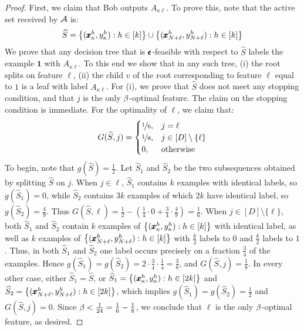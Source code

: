 \begin{proof}
First, we claim that Bob outputs $A_{\kappa\ell}$. To prove this, note that the active set received by $\mathcal{A}$ is:
\begin{align*}
    \widehat S = \left\{(\pmb{x}_{ \kappa }^h,y_{ \kappa}^h) : h \in [k] \right\} \cup \left\{(\pmb{x}_{ N+\ell }^h, y_{N +\ell}^h) : h \in [k]\right\} 
\end{align*}
We prove that any decision tree that is $\pmb{\epsilon}$-feasible with respect to $\widehat S$ labels the example $\pmb{1}$ with $A_{\kappa \ell}$. To this end we show that in any such tree, (i) the root splits on feature $\ell$, (ii) the child $v$ of the root corresponding to feature $\ell$ equal to $1$ is a leaf with label $A_{\kappa\ell}$. For (i), we prove that $\widehat S$ does not meet any stopping condition, and that $j$ is the only $\beta$-optimal feature. The claim on the stopping condition is immediate. For the optimality of $\ell$, we claim that:
\begin{align}
    G(\widehat S, j) =
\begin{cases}
\nicefrac{1}{6},& j=\ell\\
\nicefrac{1}{8},& j \in [D] \setminus \{\ell\}\\
0, &\text{otherwise}
\end{cases}
\end{align}
To begin, note that $g(\widehat S)=\frac{1}{2}$. Let $\widehat S_1$ and $\widehat S_2$ be the two subsequences obtained by splitting $\widehat S$ on $j$. When $j \in \ell$, $\widehat S_1$ contains $k$ examples with identical labels, so $g(\widehat S_1)=0$, while $\widehat S_2$ contains $3k$ examples of which $2k$ have identical label, so $g(\widehat S_2)=\frac{4}{9}$. Thus $G(\widehat S,\ell) = \frac{1}{2} - \left(\frac{1}{4}\cdot 0 + \frac{3}{4} \cdot \frac{4}{9}\right) = \frac{1}{6}$.
When $j \in [D] \setminus \{\ell\}$, both $\widehat S_1$ and $\widehat S_2$ contain $k$ examples of $\left\{(\pmb{x}_{ \kappa }^h,y_{ \kappa}^h) : h \in [k] \right\}$ with identical label, as well as $k$ examples of $\left\{(\pmb{x}_{N+\ell}^h,y_{N+\ell}^h) : h \in [k]\right\}$ with $\frac{k}{2}$ labels to $0$ and $\frac{k}{2}$ labels to $1$. Thus, in both $\widehat S_1$ and $\widehat S_2$ one label occurs precisely on a fraction $\frac{3}{4}$ of the examples. Hence $g(\widehat S_1)=g(\widehat S_2)=2 \cdot \frac{3}{4} \cdot \frac{1}{4} = \frac{3}{8}$, and $G(\widehat S,j) = \frac{1}{8}$. 
In every other case, either $\widehat S_1=\widehat S$, or $\widehat S_1=\left\{(\pmb{x}_{ \kappa }^h,y_{ \kappa}^h) : h \in [2k] \right\}$ and $\widehat S_2=\left\{(\pmb{x}_{N+\ell}^h, y_{N+\ell}^h) : h \in [2k]\right\}$, which implies $g(\widehat S_1)=g(\widehat S_2)=\frac{1}{2}$ and $G(\widehat S,j)=0$.
Since $\beta < \frac{1}{24} = \frac{1}{6}-\frac{1}{8}$, we conclude that $\ell$ is the only $\beta$-optimal feature, as desired.


\end{proof}
